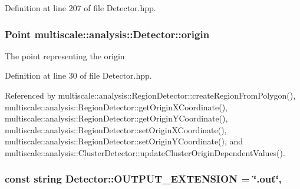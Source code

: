 Definition at line 207 of file Detector.\-hpp.

\hypertarget{classmultiscale_1_1analysis_1_1Detector_a002237e2ad684975a7c8b1e12dd7d780}{
\subsubsection[{origin}]{\setlength{\rightskip}{0pt plus 5cm}Point multiscale\-::analysis\-::\-Detector\-::origin\hspace{0.3cm}{\ttfamily [protected]}}}\label{classmultiscale_1_1analysis_1_1Detector_a002237e2ad684975a7c8b1e12dd7d780}
The point representing the origin 

Definition at line 30 of file Detector.\-hpp.



Referenced by multiscale\-::analysis\-::\-Region\-Detector\-::create\-Region\-From\-Polygon(), multiscale\-::analysis\-::\-Region\-Detector\-::get\-Origin\-X\-Coordinate(), multiscale\-::analysis\-::\-Region\-Detector\-::get\-Origin\-Y\-Coordinate(), multiscale\-::analysis\-::\-Region\-Detector\-::set\-Origin\-X\-Coordinate(), multiscale\-::analysis\-::\-Region\-Detector\-::set\-Origin\-Y\-Coordinate(), and multiscale\-::analysis\-::\-Cluster\-Detector\-::update\-Cluster\-Origin\-Dependent\-Values().

\hypertarget{classmultiscale_1_1analysis_1_1Detector_a3030def7fe61741fcc8f5c8b50f40e57}{
\subsubsection[{O\-U\-T\-P\-U\-T\-\_\-\-E\-X\-T\-E\-N\-S\-I\-O\-N}]{\setlength{\rightskip}{0pt plus 5cm}const string Detector\-::\-O\-U\-T\-P\-U\-T\-\_\-\-E\-X\-T\-E\-N\-S\-I\-O\-N = \char`\"{}.out\char`\"{}\hspace{0.3cm}{\ttfamily [static]}, {\ttfamily [protected]}}}\label{classmultiscale_1_1analysis_1_1Detector_a3030def7fe61741fcc8f5c8b50f40e57}



